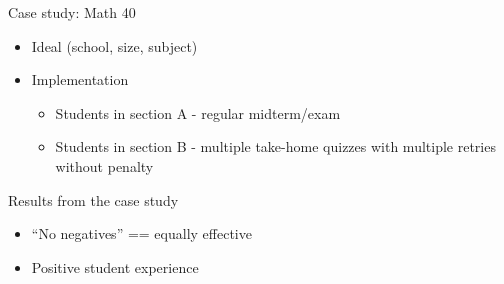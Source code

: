 \documentclass{beamer}
\begin{document}
\begin{frame}{Case study: Math 40}
  \begin{itemize}
    \item Ideal (school, size, subject)
    \item Implementation
    \begin{itemize}
      \item Students in section A - regular midterm/exam
      \item Students in section B - multiple take-home quizzes with multiple retries without penalty
    \end{itemize}
  \end{itemize}
\end{frame}
\begin{frame}{Results from the case study}
  \begin{itemize}
    \item ``No negatives'' == equally effective
    \item Positive student experience
  \end{itemize}
\end{frame}
\end{document}
